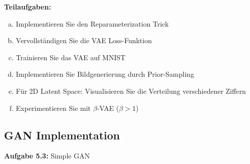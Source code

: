 \documentclass[12pt,a4paper]{article}
\begin{document}
\textbf{Teilaufgaben:}
\begin{enumerate}[(a)]
    \item Implementieren Sie den Reparameterization Trick
    \item Vervollständigen Sie die VAE Loss-Funktion
    \item Trainieren Sie das VAE auf MNIST
    \item Implementieren Sie Bildgenerierung durch Prior-Sampling
    \item Für 2D Latent Space: Visualisieren Sie die Verteilung verschiedener Ziffern
    \item Experimentieren Sie mit $\beta$-VAE ($\beta > 1$)
\end{enumerate}

\subsection{GAN Implementation}

\textbf{Aufgabe 5.3:} Simple GAN
\end{document}
